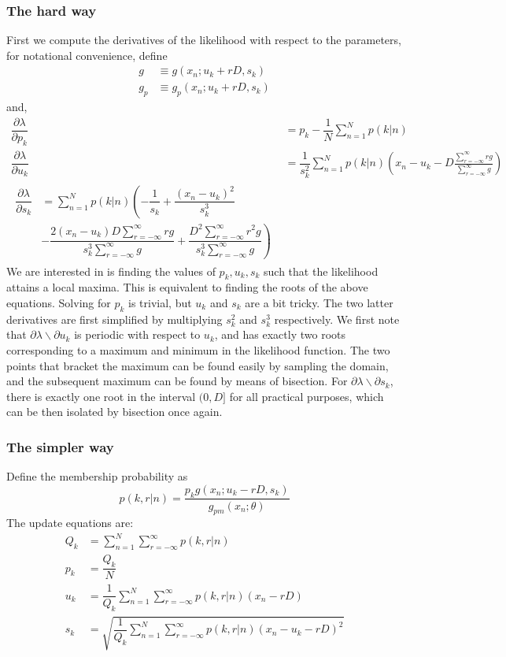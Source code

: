 \documentclass{acm_proc_article-sp}
\begin{document}
\subsubsection{The hard way}
First we compute the derivatives of the likelihood with respect to the parameters, for notational convenience, define
\begin{align*}
g & \equiv g(x_n; u_k+rD, s_k) \\
g_p & \equiv g_p(x_n; u_k+rD, s_k)
\end{align*}
and,
\begin{align}
\dfrac{\partial \lambda}{\partial p_k} & = p_k - \dfrac{1}{N} \sum\limits^{N}_{n=1}p(k|n) \\
\dfrac{\partial \lambda}{\partial u_k} &= \dfrac{1}{s_k^2} \sum_{n=1}^{N}p(k|n) \left(x_n - u_k - D \frac{\sum\limits^{\infty}_{r=-\infty} rg}{\sum\limits^{\infty}_{r=-\infty}g} \right) \\
\begin{split}
\dfrac{\partial \lambda}{\partial s_k} & = \sum\limits^{N}_{n=1}p(k|n) \left(-\dfrac{1}{s_k} + \dfrac{(x_n-u_k)^2}{s_k^3}\right. \\
&\left. -\dfrac{2(x_n-u_k)D\sum\limits^{\infty}_{r=-\infty}rg}{s_k^3 \sum\limits^{\infty}_{r=-\infty}g} + \dfrac{D^2 \sum\limits^{\infty}_{r=-\infty}r^2g}{s_k^3 \sum\limits^{\infty}_{r=-\infty}g} \right)
\end{split}
\end{align}
We are interested in is finding the values of \textbf{$p_k, u_k, s_k$} such that the likelihood attains a local maxima. This is equivalent to finding the roots of the above equations. Solving for \(p_k\) is trivial, but \(u_k\) and \(s_k\) are a bit tricky.  The two latter derivatives are first simplified by multiplying \(s_k^2\) and \(s_k^3\) respectively. We first note that \(\partial \lambda \backslash \partial u_k \) is periodic with respect to \(u_k\), and has exactly two roots corresponding to a  maximum  and minimum in the likelihood function. The two points that bracket the maximum can be found easily by sampling the domain, and the subsequent maximum can be found by means of bisection. For \(\partial \lambda \backslash \partial s_k\), there is exactly one root in the interval \((0, D]\) for all practical purposes, which can be then isolated by bisection once again.
\subsubsection{The simpler way}
Define the membership probability as
\begin{equation}
p(k,r|n) = \dfrac{ p_k g(x_n; u_k-rD, s_k) } { g_{pm} (x_n; \theta) }
\end{equation}
The update equations are:
\begin{align}
Q_k &= \sum\limits^{N}_{n=1} \sum\limits^{\infty}_{r=-\infty} p(k,r|n) \\
p_k &= \dfrac{Q_k}{N} \\
u_k &= \dfrac{1}{Q_k}\sum\limits^{N}_{n=1} \sum\limits^{\infty}_{r=-\infty} p(k,r|n)(x_n-rD) \\
s_k & = \sqrt{ \dfrac{1}{Q_k} \sum\limits^{N}_{n=1} \sum\limits^{\infty}_{r=-\infty} p(k,r|n)(x_n-u_k-rD)^2 }
\end{align} 
\end{document}
